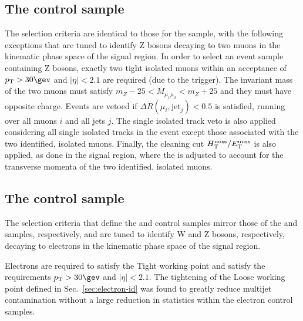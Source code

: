 \subsection{The \texorpdfstring{\mmj}{di-muon plus jets} control sample}


The selection criteria are identical to those for the \mj sample, with
the following exceptions that are tuned to identify Z bosons decaying
to two muons in the kinematic phase space of the signal region. 
In order to select an event sample containing Z bosons, exactly two
tight isolated muons within an acceptance of $\Pt > 30\gev$ and
$|\eta| < 2.1$ are required (due to the trigger). The invariant mass
of the two muons must satisfy $m_{Z} - 25 < M_{\mu_1\mu_2} < m_{Z} +
25$ and they must have opposite charge. Events are vetoed if $\Delta
R(\mu_{i},\textrm{jet}_j) < 0.5$ is satisfied, running over all muons
$i$ and all jets $j$. The single isolated track veto is also applied
considering all single isolated tracks in the event except those
associated with the two identified, isolated muons. Finally, the
cleaning cut $\mbox{$H_{\rm T}^{\rm miss}$}/\mbox{$E_\text{T}^{\rm miss}$}$ is also applied, as done in the signal
region, where the \met is adjusted to account for the transverse
momenta of the two identified, isolated muons. 

\subsection{The \texorpdfstring{\ej}{electron plus jets} control sample}
\label{subsec:elecontrolSelection}

The selection criteria that define the \ej and \eej control samples
mirror those of the \mj and \mmj samples, respectively, and are tuned
to identify W and Z bosons, respectively, decaying to electrons in the
kinematic phase space of the signal region. 

Electrons are required to satisfy the Tight working point and satisfy
the requirements $\Pt> 30\gev$ and $|\eta| < 2.1$. The tightening of
the Loose working point defined in Sec.~\ref{sec:electron-id} was
found to greatly reduce multijet contamination without a large
reduction in statistics within the electron control samples.


